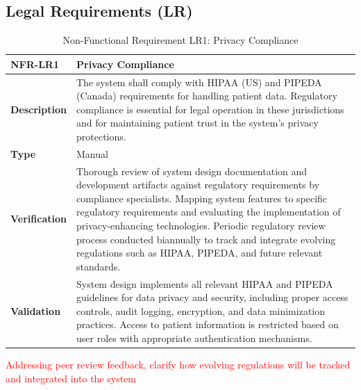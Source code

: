 \documentclass[12pt, titlepage]{article}
\begin{document}
\subsection{Legal Requirements (LR)}
\begin{table}[H]
\centering
{}
\begin{tabular}{|p{3.5cm}|p{11.5cm}|}
\hline
\rowcolor{gray!30}
\textbf{NFR-LR1} & \textbf{Privacy Compliance} \\
\hline
\textbf{Description} & The system shall comply with HIPAA (US) and PIPEDA (Canada) requirements for handling patient data. Regulatory compliance is essential for legal operation in these jurisdictions and for maintaining patient trust in the system's privacy protections. \\
\hline
\textbf{Type} & Manual \\
\hline
\textbf{Verification} & Thorough review of system design documentation and development artifacts against regulatory requirements by compliance specialists. Mapping system features to specific regulatory requirements and evaluating the implementation of privacy-enhancing technologies.
Periodic regulatory review process conducted biannually to track and integrate evolving regulations such as HIPAA, PIPEDA, and future relevant standards.
\\
\hline
\textbf{Validation} & System design implements all relevant HIPAA and PIPEDA guidelines for data privacy and security, including proper access controls, audit logging, encryption, and data minimization practices. Access to patient information is restricted based on user roles with appropriate authentication mechanisms. \\
\hline
\end{tabular}
\caption{Non-Functional Requirement LR1: Privacy Compliance}
\textcolor{red}{Addressing peer review feedback, clarify how evolving regulations will be tracked and integrated into the system}
\end{table}
\newpage
\end{document}
